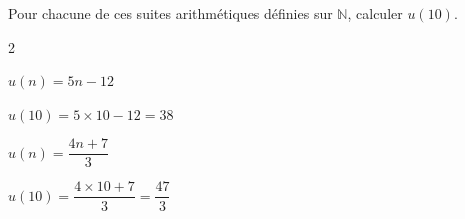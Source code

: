 \documentclass[11pt,a4paper]{article}  %
\begin{document}
	\graphicspath{{images/}}
	
	\begin{center}
		
		
	\end{center}




Pour chacune de ces suites arithmétiques définies sur $\mathbb{N}$, calculer $u(10)$.
\begin{multicols}{2}
	\begin{enumMet}
		\item $u(n)=5 n-12$
		
		\begin{corrBox}
			$u(10)=5\times 10-12=38$	
		\end{corrBox}
	
		\columnbreak
		\item $u(n)=\dfrac{4 n+7}{3}$
		
		\begin{corrBox}
			$u(10)=\dfrac{4 \times 10+7}{3}=\dfrac{47}{3}$	
		\end{corrBox}
	\end{enumMet}
\end{multicols}
\end{document}
